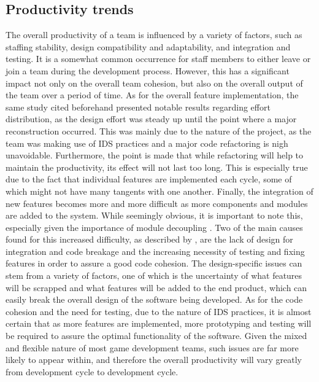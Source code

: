 \documentclass{scrartcl}
\begin{document}
    \subsection{Productivity trends}
    
    The overall productivity of a team is influenced by a variety of factors, such as staffing stability, design compatibility and adaptability, and integration and testing\cite{Source7}. It is a somewhat common occurrence for staff members to either leave or join a team during the development process. However, this has a significant impact not only on the overall team cohesion, but also on the overall output of the team over a period of time\cite{Source7}. As for the overall feature implementation, the same study cited beforehand presented notable results regarding effort distribution, as the design effort was steady up until the point where a major reconstruction occurred. This was mainly due to the nature of the project, as the team was making use of IDS practices and a major code refactoring is nigh unavoidable. Furthermore, the point is made that while refactoring will help to maintain the productivity, its effect will not last too long. This is especially true due to the fact that individual features are implemented each cycle, some of which might not have many tangents with one another. Finally, the integration of new features becomes more and more difficult as more components and modules are added to the system. While seemingly obvious, it is important to note this, especially given the importance of module decoupling \cite{Source8}. Two of the main causes found for this increased difficulty, as described by \cite{Source7}, are the lack of design for integration and code breakage and the increasing necessity of testing and fixing features in order to assure a good code cohesion. The design-specific issues can stem from a variety of factors, one of which is the uncertainty of what features will be scrapped and what features will be added to the end product, which can easily break the overall design of the software being developed. As for the code cohesion and the need for testing, due to the nature of IDS practices, it is almost certain that as more features are implemented, more prototyping and testing will be required to assure the optimal functionality of the software. Given the mixed and flexible nature of most game development teams, such issues are far more likely to appear within, and therefore the overall productivity will vary greatly from development cycle to development cycle.
        
\end{document}
